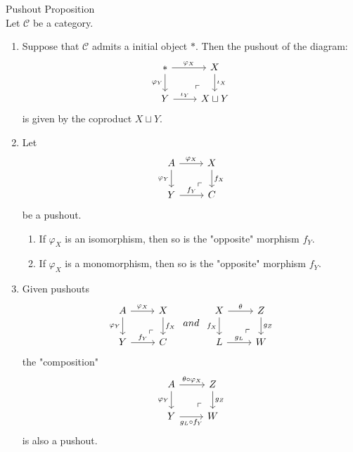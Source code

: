 \begin{proposition}{Pushout Proposition}\\
Let $\mathcal{C}$ be a category.
\begin{enumerate}
    \item Suppose that $\mathcal{C}$ admits a initial object $*$. Then the pushout of the diagram:
    $$\begin{tikzcd}
        *\arrow[r, "\varphi_X"] \arrow[d, "\varphi_Y"'] &X \arrow[d, "\iota_X"]\\
        Y \arrow[r, "\iota_Y"] &X \sqcup Y \arrow[ul, phantom, "\ulcorner", pos=0.15] 
    \end{tikzcd}$$
    is given by the coproduct $X \sqcup Y$.

    \item Let 
    $$\begin{tikzcd}
        A \arrow[r, "\varphi_X"] \arrow[d, "\varphi_Y"']  &X \arrow[d, "f_X"]\\
        Y \arrow[r, "f_Y"] &C \arrow[ul, phantom, "\ulcorner", pos=0.15]
    \end{tikzcd}$$
    be a pushout.
    \begin{enumerate}
        \item If $\varphi_X$ is an isomorphism, then so is the "opposite" morphism $f_Y$.
        \item If $\varphi_X$ is a monomorphism, then so is the "opposite" morphism $f_Y$.
    \end{enumerate}

    \item Given pushouts
    $$\begin{tikzcd}
         A \arrow[r, "\varphi_X"] \arrow[d, "\varphi_Y"']  &X \arrow[d, "f_X"]\\
        Y \arrow[r, "f_Y"] &C \arrow[ul, phantom, "\ulcorner", pos=0.15]
    \end{tikzcd} \;\;and\;\; \begin{tikzcd}
        X \arrow[r, "\theta"] \arrow[d, "f_X"'] &Z \arrow[d, "g_Z"]\\
        L \arrow[r, "g_L"] &W \arrow[ul, phantom, "\ulcorner", pos=0.15]
    \end{tikzcd}$$
    the "composition"
    $$\begin{tikzcd}
        A \arrow[r, "\theta \circ \varphi_X"] \arrow[d, "\varphi_Y"'] &Z \arrow[d, "g_Z"]\\
        Y \arrow[r, "g_L \circ f_Y"'] &W \arrow[ul, phantom, "\ulcorner", pos=0.15]
    \end{tikzcd}$$
    is also a pushout.
\end{enumerate}
\end{proposition}